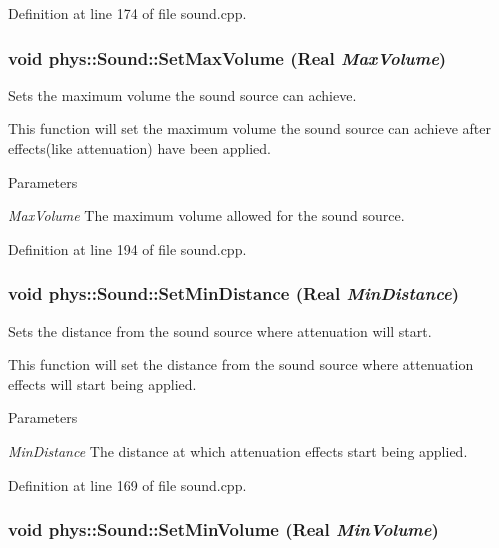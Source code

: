 Definition at line 174 of file sound.cpp.

\hypertarget{classphys_1_1Sound_a04994399e336c8a0726c5da9f6349545}{
\subsubsection[{SetMaxVolume}]{\setlength{\rightskip}{0pt plus 5cm}void phys::Sound::SetMaxVolume ({\bf Real} {\em MaxVolume})}}
\label{dc/d2f/classphys_1_1Sound_a04994399e336c8a0726c5da9f6349545}


Sets the maximum volume the sound source can achieve. 

This function will set the maximum volume the sound source can achieve after effects(like attenuation) have been applied. 
\begin{DoxyParams}{Parameters}
\item[{\em MaxVolume}]The maximum volume allowed for the sound source. \end{DoxyParams}


Definition at line 194 of file sound.cpp.

\hypertarget{classphys_1_1Sound_ae32d4c4b8a09bfbdcfea68cfa71aa354}{
\subsubsection[{SetMinDistance}]{\setlength{\rightskip}{0pt plus 5cm}void phys::Sound::SetMinDistance ({\bf Real} {\em MinDistance})}}
\label{dc/d2f/classphys_1_1Sound_ae32d4c4b8a09bfbdcfea68cfa71aa354}


Sets the distance from the sound source where attenuation will start. 

This function will set the distance from the sound source where attenuation effects will start being applied. 
\begin{DoxyParams}{Parameters}
\item[{\em MinDistance}]The distance at which attenuation effects start being applied. \end{DoxyParams}


Definition at line 169 of file sound.cpp.

\hypertarget{classphys_1_1Sound_a76a487c8a455556ba4307c99cc41ea80}{
\subsubsection[{SetMinVolume}]{\setlength{\rightskip}{0pt plus 5cm}void phys::Sound::SetMinVolume ({\bf Real} {\em MinVolume})}}
\label{dc/d2f/classphys_1_1Sound_a76a487c8a455556ba4307c99cc41ea80}


